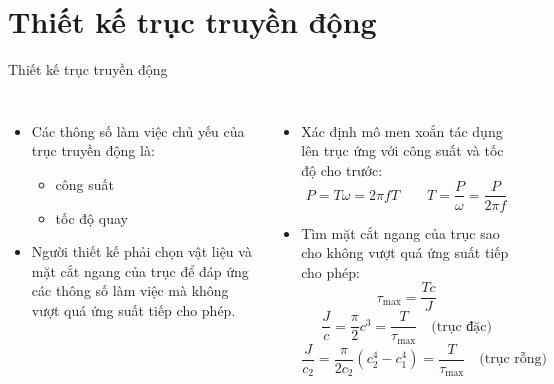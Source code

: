 \documentclass[aspectratio=169]{beamer}
\begin{document}
\section{Thiết kế trục truyền động}
\begin{frame}[t]{Thiết kế trục truyền động}
  \begin{columns}[T]
      \small
      \begin{itemize}
        \setlength{\itemsep}{0.8em}
        \item Các thông số làm việc chủ yếu của trục truyền động là:
              \begin{itemize}
                \item công suất
                \item tốc độ quay
              \end{itemize}
        \item Người thiết kế phải chọn vật liệu và mặt cắt ngang của trục
              để đáp ứng các thông số làm việc mà không vượt quá ứng suất
              tiếp cho phép.
      \end{itemize}
      \small
      \begin{itemize}
        \setlength{\itemsep}{0.6em}
        \item Xác định mô men xoắn tác dụng lên trục ứng với công suất và
              tốc độ cho trước:
        \[
          P = T\omega = 2\pi fT
          \qquad
          T = \frac{P}{\omega} = \frac{P}{2\pi f}
        \]
        \item Tìm mặt cắt ngang của trục sao cho không vượt quá ứng suất
              tiếp cho phép:
        \[
          \tau_{\max} = \frac{Tc}{J}
        \]
        \[
          \frac{J}{c} = \frac{\pi}{2}c^3 = \frac{T}{\tau_{\max}}
          \quad\text{(trục đặc)}
        \]
        \[
          \frac{J}{c_2} = \frac{\pi}{2c_2}\left(c_2^4 - c_1^4\right)
            = \frac{T}{\tau_{\max}}
          \quad\text{(trục rỗng)}
        \]
      \end{itemize}
  \end{columns}
\end{frame}
\end{document}
